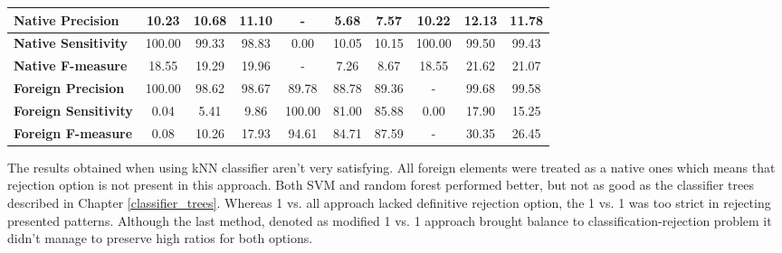 \begin{table}[htp]
{\begin{tabular}{l|c|c|c|c|c|c|c|c|c|}
	\multicolumn{1}{|l|}{\textbf{Native Precision}}          & 10.23                             & 10.68                             & 11.10                            & -                                 & 5.68                              & 7.57                             & 10.22                             & 12.13                             & 11.78                            \\ \hline
	\multicolumn{1}{|l|}{\textbf{Native Sensitivity}}        & 100.00                            & 99.33                             & 98.83                            & 0.00                              & 10.05                             & 10.15                            & 100.00                            & 99.50                             & 99.43                            \\ \hline
	\multicolumn{1}{|l|}{\textbf{Native F-measure}}          & 18.55                             & 19.29                             & 19.96                            & -                                 & 7.26                              & 8.67                             & 18.55                             & 21.62                             & 21.07                            \\ \hline
	\multicolumn{1}{|l|}{\textbf{Foreign Precision}}         & 100.00                            & 98.62                             & 98.67                            & 89.78                             & 88.78                             & 89.36                            & -                                 & 99.68                             & 99.58                            \\ \hline
	\multicolumn{1}{|l|}{\textbf{Foreign Sensitivity}}       & 0.04                              & 5.41                              & 9.86                             & 100.00                            & 81.00                             & 85.88                            & 0.00                              & 17.90                             & 15.25                            \\ \hline
	\multicolumn{1}{|l|}{\textbf{Foreign F-measure}}         & 0.08                              & 10.26                             & 17.93                            & 94.61                             & 84.71                             & 87.59                            & -                                 & 30.35                             & 26.45                            \\ \hline
\end{tabular}
}
\end{table}

The results obtained when using kNN classifier aren't very satisfying. All foreign elements were treated as a native ones which means that rejection option is not present in this approach. Both SVM and random forest performed better, but not as good as the classifier trees described in Chapter \ref{classifier_trees}. Whereas 1 vs. all approach lacked definitive rejection option, the 1 vs. 1 was too strict in rejecting presented patterns. Although the last method, denoted as modified 1 vs. 1 approach brought balance to classification-rejection problem it didn't manage to preserve high ratios for both options.